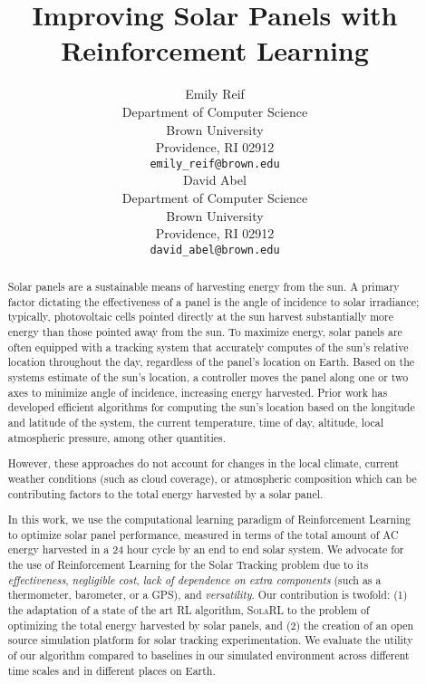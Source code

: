 \documentclass[11pt]{article}
\title{Improving Solar Panels with Reinforcement Learning}
\author{
Emily Reif \\
Department of Computer Science\\
Brown University\\
Providence, RI 02912 \\
\texttt{emily\_reif@brown.edu} \\
\And
David Abel \\
Department of Computer Science\\
Brown University \\
Providence, RI 02912 \\
\texttt{david\_abel@brown.edu} \\
}
\date{}
\begin{document}
\maketitle

\begin{abstract}
Solar panels are a sustainable means of harvesting energy from the sun. A primary factor dictating the effectiveness of a panel is the angle of incidence to solar irradiance; typically, photovoltaic cells pointed directly at the sun harvest substantially more energy than those pointed away from the sun. To maximize energy, solar panels are often equipped with a tracking system that accurately computes of the sun's relative location throughout the day, regardless of the panel's location on Earth. Based on the systems estimate of the sun's location, a controller moves the panel along one or two axes to minimize angle of incidence, increasing energy harvested. Prior work has developed efficient algorithms for computing the sun's location based on the longitude and latitude of the system, the current temperature, time of day, altitude, local atmospheric pressure, among other quantities.

However, these approaches do not account for changes in the local climate, current weather conditions (such as cloud coverage), or atmospheric composition which can be contributing factors to the total energy harvested by a solar panel.

In this work, we use the computational learning paradigm of Reinforcement Learning to optimize solar panel performance, measured in terms of the total amount of AC energy harvested in a 24 hour cycle by an end to end solar system. We advocate for the use of Reinforcement Learning for the Solar Tracking problem due to its {\it effectiveness}, {\it negligible cost}, {\it lack of dependence on extra components} (such as a thermometer, barometer, or a GPS), and {\it versatility}. Our contribution is twofold: (1) the adaptation of a state of the art RL algorithm, \textsc{SolaRL} to the problem of optimizing the total energy harvested by solar panels, and (2) the creation of an open source simulation platform for solar tracking experimentation. We evaluate the utility of our algorithm compared to baselines in our simulated environment across different time scales and in different places on Earth.
\end{abstract}

\end{document}
